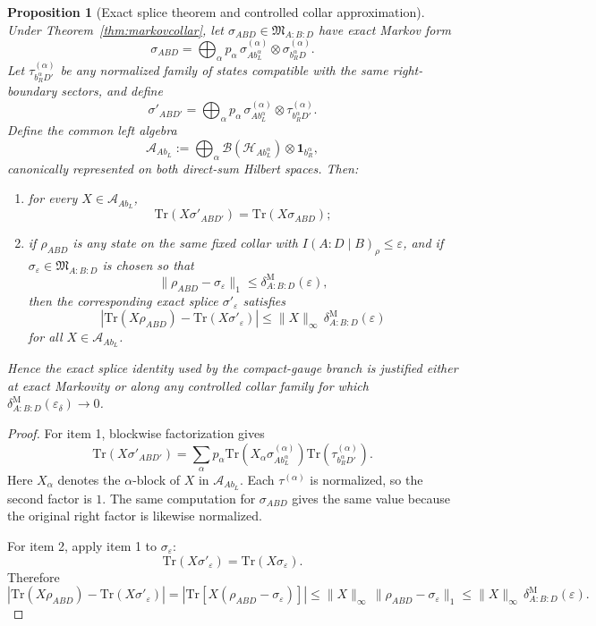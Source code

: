 \documentclass[11pt]{article}
\newtheorem{proposition}[theorem]{Proposition}
\begin{document}
\begin{proposition}[Exact splice theorem and controlled collar approximation]\label{prop:splice}
Under Theorem~\ref{thm:markovcollar}, let \(\sigma_{ABD}\in \mathfrak M_{A:B:D}\) have exact Markov form
\[
\sigma_{ABD}
=
\bigoplus_\alpha p_\alpha\,
\sigma^{(\alpha)}_{A b_L^\alpha}\otimes \sigma^{(\alpha)}_{b_R^\alpha D}.
\]
Let \(\tau^{(\alpha)}_{b_R^\alpha D'}\) be any normalized family of states compatible with the same right-boundary sectors, and define
\[
\sigma'_{AB D'}
=
\bigoplus_\alpha p_\alpha\,
\sigma^{(\alpha)}_{A b_L^\alpha}\otimes \tau^{(\alpha)}_{b_R^\alpha D'}.
\]
Define the common left algebra
\[
\mathcal A_{A b_L}:=
\bigoplus_\alpha \mathcal B(\mathcal H_{A b_L^\alpha})\otimes \mathbf 1_{b_R^\alpha},
\]
canonically represented on both direct-sum Hilbert spaces. Then:
\begin{enumerate}[leftmargin=2em]
\item for every \(X\in\mathcal A_{A b_L}\),
\[
\mathrm{Tr}(X\sigma'_{AB D'})=\mathrm{Tr}(X\sigma_{ABD});
\]
\item if \(\rho_{ABD}\) is any state on the same fixed collar with \(I(A:D\mid B)_\rho\le \varepsilon\), and if \(\sigma_\varepsilon\in\mathfrak M_{A:B:D}\) is chosen so that
\[
\|\rho_{ABD}-\sigma_\varepsilon\|_1
\le
\delta^{\mathrm M}_{A:B:D}(\varepsilon),
\]
then the corresponding exact splice \(\sigma'_{\varepsilon}\) satisfies
\[
\left|
\mathrm{Tr}(X\rho_{ABD})-\mathrm{Tr}(X\sigma'_{\varepsilon})
\right|
\le
\|X\|_\infty\,\delta^{\mathrm M}_{A:B:D}(\varepsilon)
\]
for all \(X\in\mathcal A_{A b_L}\).
\end{enumerate}
Hence the exact splice identity used by the compact-gauge branch is justified either at exact Markovity or along any controlled collar family for which \(\delta^{\mathrm M}_{A:B:D}(\varepsilon_\delta)\to 0\).
\end{proposition}

\begin{proof}
For item 1, blockwise factorization gives
\[
\mathrm{Tr}(X\sigma'_{AB D'})
=
\sum_\alpha p_\alpha
\mathrm{Tr}\!\left(X_\alpha\sigma^{(\alpha)}_{A b_L^\alpha}\right)
\mathrm{Tr}\!\left(\tau^{(\alpha)}_{b_R^\alpha D'}\right).
\]
Here \(X_\alpha\) denotes the \(\alpha\)-block of \(X\) in \(\mathcal A_{A b_L}\). Each \(\tau^{(\alpha)}\) is normalized, so the second factor is \(1\). The same computation for \(\sigma_{ABD}\) gives the same value because the original right factor is likewise normalized.

For item 2, apply item 1 to \(\sigma_\varepsilon\):
\[
\mathrm{Tr}(X\sigma'_{\varepsilon})=\mathrm{Tr}(X\sigma_{\varepsilon}).
\]
Therefore
\[
\left|
\mathrm{Tr}(X\rho_{ABD})-\mathrm{Tr}(X\sigma'_{\varepsilon})
\right|
=
\left|
\mathrm{Tr}\!\left[X(\rho_{ABD}-\sigma_{\varepsilon})\right]
\right|
\le
\|X\|_\infty\,\|\rho_{ABD}-\sigma_{\varepsilon}\|_1
\le
\|X\|_\infty\,\delta^{\mathrm M}_{A:B:D}(\varepsilon).
\]
\end{proof}
\end{document}
